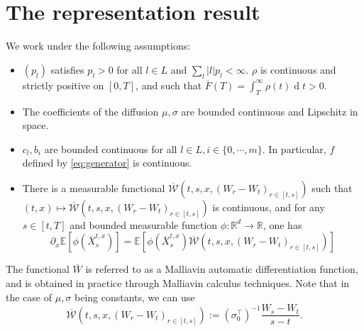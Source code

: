 \documentclass[11pt]{article}
\newcommand{\R}{\mathbb{R}}
\newcommand{\diff}{\ensuremath{\operatorname{d}\!}}
\theoremstyle{definition}
\theoremstyle{remark}
\begin{document}
 \section{The representation result}
 \label{section:representation-result}

We work under the following assumptions:
\begin{itemize}
	\item $(p_l)$ satisfies $p_l > 0$ for all $l \in L$ and $\sum_l |l|p_l < \infty$. $\rho$ is continuous and strictly positive on $[0,T]$, and such that $\overline{F}(T) = \int_{T}^{\infty} \rho(t) \diff t > 0$. 
	\item The coefficients of the diffusion $\mu,\sigma$ are bounded continuous and Lipschitz in space.
	\item $c_l,b_i$ are bounded continuous for all $l\in L, i\in \{0,\cdots, m\}$. In particular, $f$ defined by \eqref{eq:generator} is continuous.
	\item There is a measurable functional $\overline{\mathcal W}(t,s,x,(W_r - W_t) _{r \in [t,s]})$ such that $(t,x) \mapsto \overline{\mathcal W}(t,s,x,(W_r - W_t) _{r \in [t,s]})$ is continuous, and for any $s \in [t,T]$ and bounded measurable function $\phi : \mathbb R ^{d} \rightarrow \R$, one has
		\begin{equation}
			\label{eq:malliavin-assumption}
			\partial_x \mathbb E \left[ \phi( \overline{X} ^{t,x}_{s}) \right] = \mathbb E \left[ \phi(\overline{X} ^{t,x}_{s}) \overline{\mathcal W}(t,s,x,(W_r - W_t) _{r \in [t,s]})\right]
		\end{equation}
\end{itemize}

The functional $\overline{W}$ is referred to as a Malliavin automatic differentiation function, and is obtained in practice through Malliavin calculus techniques. Note that in the case of $\mu,\sigma$ being constants, we can use 
 \[
 \overline{\mathcal{W}}\left(t, s, x,\left(W_r-W_t\right)_{r \in[t, s]}\right):=\left(\sigma_0^{\top}\right)^{-1} \frac{W_s-W_t}{s-t} .
 \]
\end{document}
